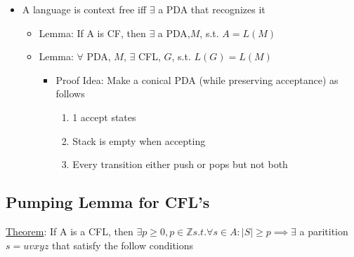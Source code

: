 \documentclass[11pt]{article}
\begin{document}
\begin{itemize}
\item A language is context free iff $\exists$ a PDA that recognizes it

\begin{itemize}
\item Lemma: If A is CF, then $\exists$ a PDA,$M$, s.t. $A = L(M)$
\item Lemma: $\forall$ PDA, $M$, $\exists$ CFL, $G$, s.t. $L(G)=L(M)$

\begin{itemize}
\item Proof Idea: Make a conical PDA (while preserving acceptance)
         as follows

\begin{enumerate}
\item 1 accept states
\item Stack is empty when accepting
\item Every transition either push or pops but not both
\end{enumerate}

\end{itemize}

\end{itemize}

\end{itemize}
\subsection{Pumping Lemma for CFL's}
\label{sec-3.6}

   \underline{Theorem}: If A is a CFL, then $\exists p \geq 0, p\in\mathbb{Z}
   s.t. \forall s\in A : |S| \geq p \implies \exists$ a paritition
   $s=uvxyz$ that satisfy the follow conditions 
\end{document}
